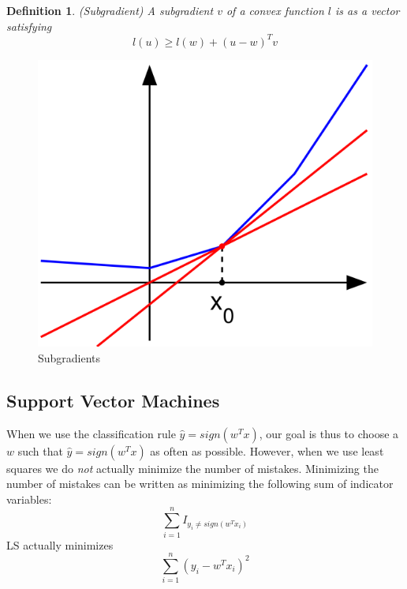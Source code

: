 \documentclass[12pt]{article}
\newtheorem{definition}{Definition}
\theoremstyle{definition}
\begin{document}
\begin{definition}(Subgradient)
A subgradient $v$ of a convex function $l$ is as a vector satisfying
\begin{equation}
	l(u) \geq l(w) + (u - w)^T v
\end{equation}
\end{definition}
\begin{figure}[H]
	\begin{center}
		\includegraphics[scale=.4]{subgrad.png}
	\end{center}
	\caption{Subgradients}
\end{figure}

\subsection{Support Vector Machines}

When we use the classification rule $\hat y = sign(w^T x)$, our goal is thus to choose a $w$ such that $\hat y = sign(w^T x)$ as often as possible. However, when we use least squares we do \textit{not} actually minimize the number of mistakes. Minimizing the number of mistakes can be written as minimizing the following sum of indicator variables:
\begin{equation}
	\sum_{i=1}^n I_{y_i \neq sign(w^Tx_i)}
\end{equation}
LS actually minimizes
\begin{equation}
	\sum_{i=1}^n (y_i - w^T x_i)^2
\end{equation}
\end{document}
